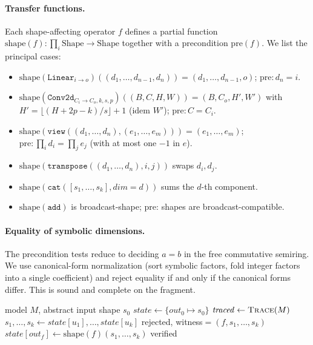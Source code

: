 \documentclass{article}
\theoremstyle{definition}
\begin{document}
\paragraph{Transfer functions.} Each shape-affecting operator
$f$ defines a partial function
$\mathrm{shape}(f) : \prod_i \mathrm{Shape}\to \mathrm{Shape}$ together
with a precondition $\mathrm{pre}(f)$. We list the principal cases:

\begin{itemize}\itemsep0pt
\item $\mathrm{shape}(\mathtt{Linear}_{i\to o})((d_1,\ldots,d_{n-1},d_n))
       = (d_1,\ldots,d_{n-1},o)$;
       $\mathrm{pre}: d_n=i$.
\item $\mathrm{shape}(\mathtt{Conv2d}_{C_i\to C_o,k,s,p})
       ((B,C,H,W))=(B,C_o,H',W')$ with
       $H'=\lfloor(H+2p-k)/s\rfloor+1$ (idem $W'$);
       $\mathrm{pre}: C=C_i$.
\item $\mathrm{shape}(\mathtt{view}((d_1,\ldots,d_n),(e_1,\ldots,e_m)))
       = (e_1,\ldots,e_m)$;
       $\mathrm{pre}: \prod_i d_i = \prod_j e_j$ (with at most one
       $-1$ in $e$).
\item $\mathrm{shape}(\mathtt{transpose}((d_1,\ldots,d_n),i,j))$
       swaps $d_i,d_j$.
\item $\mathrm{shape}(\mathtt{cat}([s_1,\ldots,s_k],\mathit{dim}=d))$
       sums the $d$-th component.
\item $\mathrm{shape}(\mathtt{add})$ is broadcast-shape;
       $\mathrm{pre}$: shapes are broadcast-compatible.
\end{itemize}

\paragraph{Equality of symbolic dimensions.} The precondition tests
reduce to deciding $a=b$ in the free commutative semiring. We use
canonical-form normalization (sort symbolic factors, fold integer
factors into a single coefficient) and reject equality if and only if
the canonical forms differ. This is sound and complete on the
fragment.

\begin{algorithm}[t]
\caption{\textsc{TensorGuard} verification of an \texttt{nn.Module}}
\label{alg:verify}
\begin{algorithmic}[1]
\Require model $M$, abstract input shape $s_0$
\State $\mathit{state}\gets\{\mathit{out}_0\mapsto s_0\}$
\State $\mathit{traced}\gets\textsc{Trace}(M)$
   \State $s_1,\ldots,s_k\gets\mathit{state}[u_1],\ldots,\mathit{state}[u_k]$
       \State \Return \textsf{rejected}, witness$=(f,s_1,\ldots,s_k)$
   \EndIf
   \State $\mathit{state}[\mathit{out}_f]\gets\mathrm{shape}(f)(s_1,\ldots,s_k)$
\EndFor
\State \Return \textsf{verified}
\end{algorithmic}
\end{algorithm}
\end{document}
